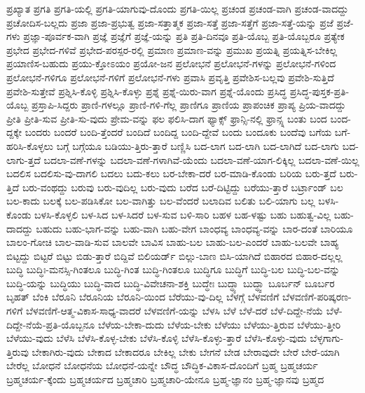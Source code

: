 {ಪ್ರಖ್ಯಾತ
ಪ್ರಗತಿ
ಪ್ರಗತಿ-ಯಲ್ಲಿ
ಪ್ರಗತಿ-ಯಾಗುವು-ದೊಂದು
ಪ್ರಗತಿ-ಯಿಲ್ಲ
ಪ್ರಚಂಡ
ಪ್ರಚಂಡ-ವಾಗಿ
ಪ್ರಚಂಡ-ವಾದದ್ದು
ಪ್ರಚೋದಿಸ-ಬಲ್ಲದು
ಪ್ರಜಾ
ಪ್ರಜಾ-ಪ್ರಭುತ್ವ
ಪ್ರಜಾ-ಸತ್ತಾತ್ಮಕ
ಪ್ರಜಾ-ಸತ್ತೆ
ಪ್ರಜಾ-ಸತ್ತೆಗೆ
ಪ್ರಜಾ-ಸತ್ತೆ-ಯನ್ನು
ಪ್ರಜೆ
ಪ್ರಜೆ-ಗಳು
ಪ್ರಜ್ಞಾ-ಪೂರ್ವಕ-ವಾಗಿ
ಪ್ರಜ್ಞೆ
ಪ್ರಜ್ಞೆಗೆ
ಪ್ರಜ್ಞೆ-ಯನ್ನು
ಪ್ರತಿ
ಪ್ರತಿ-ದಿನವೂ
ಪ್ರತಿ-ಯೊಬ್ಬ
ಪ್ರತಿ-ಯೊಬ್ಬರೂ
ಪ್ರತ್ಯೇಕ
ಪ್ರಭೇದ
ಪ್ರಭೇದ-ಗಳಿವೆ
ಪ್ರಭೇದ-ಪರಸ್ಪರ-ರಲ್ಲಿ
ಪ್ರಮಾಣ
ಪ್ರಮಾಣ-ವನ್ನು
ಪ್ರಮುಖ
ಪ್ರಯತ್ನಿ
ಪ್ರಯತ್ನಿಸ-ಬೇಕಿಲ್ಲ
ಪ್ರಯಾಣಿಸ-ಬಹುದು
ಪ್ರಯು-ಕ್ತೋಽಯಂ
ಪ್ರಯೋ-ಜನ
ಪ್ರಲೋಭನೆ
ಪ್ರಲೋಭನೆ-ಗಳನ್ನು
ಪ್ರಲೋಭನೆ-ಗಳಿಂದ
ಪ್ರಲೋಭನೆ-ಗಳಿಗೂ
ಪ್ರಲೋಭನೆ-ಗಳಿಗೆ
ಪ್ರಲೋಭನೆ-ಗಳು
ಪ್ರವಾಸಿ
ಪ್ರವೃತ್ತಿ
ಪ್ರವೇಶಿಸ-ಬಲ್ಲವು
ಪ್ರವೇಶಿ-ಸುತ್ತಿದೆ
ಪ್ರವೇಶಿ-ಸುತ್ತೇವೆ
ಪ್ರಶ್ನಿಸಿ-ಕೊಳ್ಳಿ
ಪ್ರಶ್ನಿಸಿ-ಕೊಳ್ಳು
ಪ್ರಶ್ನೆ
ಪ್ರಶ್ನೆ-ಯಿರು-ವಾಗ
ಪ್ರಶ್ನೆ-ಯೊಂದು
ಪ್ರಸಿದ್ಧ
ಪ್ರಸಿದ್ಧ-ಪುಸ್ತಕ-ಪ್ರತಿ-ಯೊಬ್ಬ
ಪ್ರಸ್ತಾಪಿ-ಸಿದ್ದರು
ಪ್ರಾಣಿ-ಗಳಲ್ಲೂ
ಪ್ರಾಣಿ-ಗಳಿ-ಗೆಲ್ಲ
ಪ್ರಾಣಿಗೂ
ಪ್ರಾಣಿಯ
ಪ್ರಾಪಂಚಿಕ
ಪ್ರಾಪ್ಯ
ಪ್ರಿಯ-ವಾದದ್ದು
ಪ್ರೀತಿ
ಪ್ರೀತಿ-ಸುವ
ಪ್ರೀತಿ-ಸು-ವುದು
ಪ್ರೇಮ-ವನ್ನು
ಫಲ
ಫಲಿಸಿ-ದಾಗ
ಫ್ಯಾಕ್ಸ್
ಫ್ರಾನ್ಸಿ-ನಲ್ಲಿ
ಫ್ರಾನ್ಸ್ನ
ಬಂತು
ಬಂದ
ಬಂದ-ದ್ದಕ್ಕೇ
ಬಂದರು
ಬಂದರೆ
ಬಂದಿ-ತ್ತೆಂದರೆ
ಬಂದಿದೆ
ಬಂದಿದ್ದ
ಬಂದಿ-ದ್ದೇವೆ
ಬಂದು
ಬಂದೂಕು
ಬಂದೆವು
ಬಗೆಯ
ಬಗೆ-ಹರಿಸಿ-ಕೊಳ್ಳಲು
ಬಗ್ಗೆ
ಬಗ್ಗೆಯೂ
ಬಡಿಯು-ತ್ತಿರು-ತ್ತಾರೆ
ಬಣ್ಣಿಸಿ
ಬದ-ಲಾಗ
ಬದ-ಲಾಗಿ
ಬದ-ಲಾಗಿದೆ
ಬದ-ಲಾಗು
ಬದ-ಲಾಗು-ತ್ತದೆ
ಬದಲಾ-ವಣೆ-ಗಳನ್ನು
ಬದಲಾ-ವಣೆ-ಗಳಾಗಿವೆ-ಯೆಂದು
ಬದಲಾ-ವಣೆ-ಯಾಗ-ಲಿಕ್ಕಿಲ್ಲ
ಬದಲಾ-ವಣೆ-ಯಿಲ್ಲ
ಬದಲಿಸ
ಬದಲಿಸು-ವು-ದಾಗಲಿ
ಬದಲು
ಬದು-ಕಲು
ಬರ-ಬೇಕಾ-ದರೆ
ಬರ-ಮಾಡಿ-ಕೊಂಡು
ಬರಿಯ
ಬರು-ತ್ತದೆ
ಬರು-ತ್ತಿದೆ
ಬರು-ವಂಥದ್ದು
ಬರುವು
ಬರು-ವುದಿಲ್ಲ
ಬರು-ವುದು
ಬರೆದ
ಬರೆ-ದಿಟ್ಟಿದ್ದು
ಬರೆಯು-ತ್ತಾರೆ
ಬರ್ಟ್ರಾಂಡ್
ಬಲ
ಬಲ-ಕಾದು
ಬಲಕ್ಕೆ
ಬಲ-ಪಡಿಸಿಕೋ
ಬಲ-ವಾಗಿತ್ತು
ಬಲ-ವೆಂದರೆ
ಬಲಾದಿವ
ಬಲಿತು
ಬಲಿ-ಯಾಗು
ಬಲ್ಲ
ಬಳಸಿ-ಕೊಂಡು
ಬಳಸಿ-ಕೊಳ್ಳಲಿ
ಬಳ-ಸಿದ
ಬಳ-ಸಿದರೆ
ಬಳ-ಸುವ
ಬಳಿ-ಸಾರಿ
ಬಹಳ
ಬಹ-ಳಷ್ಟು
ಬಹು
ಬಹುತ್ವ-ವಿಲ್ಲ
ಬಹು-ದಾದದ್ದು
ಬಹುದು
ಬಹು-ಭಾಗ-ವನ್ನು
ಬಹು-ವಾಗಿ
ಬಹು-ವೇಗ
ಬಾಂಧವ್ಯ
ಬಾಂಧವ್ಯ-ವನ್ನು
ಬಾರ-ದಂತೆ
ಬಾರಿಯೂ
ಬಾಲಂ-ಗೋಚಿ
ಬಾಲ-ವಾಡಿ-ಸುವ
ಬಾಲವೇ
ಬಾವಿಸ
ಬಾಹು-ಬಲ
ಬಾಹು-ಬಲ-ಎಂದರೆ
ಬಾಹು-ಬಲವೇ
ಬಾಹ್ಯ
ಬಿಟ್ಟದ್ದು
ಬಿಟ್ಟರೆ
ಬಿಟ್ಟು
ಬಿಡು-ತ್ತಾರೆ
ಬಿದ್ದಿವೆ
ಬಿಲಿಯರ್ಡ್
ಬಿಲ್ಲು-ಬಾಣ
ಬಿಸಿ-ಯಾಗಿದೆ
ಬಿಹಾರದ
ಬಿಹಾರ-ದಲ್ಲಲ್ಲ
ಬುದ್ಧಿ
ಬುದ್ಧಿಃ-ಮನಸ್ಸಿ-ಗಿಂತಲೂ
ಬುದ್ಧಿ-ಗಿಂತ
ಬುದ್ಧಿ-ಗಿಂತಲೂ
ಬುದ್ಧಿಗೂ
ಬುದ್ಧಿಗೆ
ಬುದ್ಧಿ-ಬಲ
ಬುದ್ಧಿ-ಬಲ-ವನ್ನು
ಬುದ್ಧಿ-ಯನ್ನು
ಬುದ್ಧಿಯು
ಬುದ್ಧಿ-ವಾದ
ಬುದ್ಧಿ-ವಿವೇಚನಾ-ಶಕ್ತಿ
ಬುದ್ಧೇಃ
ಬುದ್ಧ್ಯಾ
ಬುದ್ಧ್ವಾ
ಬೂರ್ಬನ್
ಬೂರ್ಬರ
ಬೃಹತ್
ಬೆಂಕಿ
ಬೆರೂನಿ
ಬೆರೂನಿಯ
ಬೆರೂನಿ-ಯಿಂದ
ಬೆರೆಯು-ವು-ದಿಲ್ಲ
ಬೆಳಗ್ಗೆ
ಬೆಳವಣಿಗೆ
ಬೆಳವಣಿಗೆ-ಪರಿಷ್ಕರಣ-ಗಳಿಗೆ
ಬೆಳವಣಿಗೆ-ಆತ್ಮ-ವಿಕಾಸ-ಸಾಧ್ಯ-ವಾದರೆ
ಬೆಳವಣಿಗೆ-ಯನ್ನು
ಬೆಳಸಿ
ಬೆಳೆ
ಬೆಳೆ-ದರೆ
ಬೆಳೆ-ದಿದ್ದೇ-ನೆಯೆ
ಬೆಳೆ-ದಿದ್ದೇ-ನೆಯೆ-ಪ್ರತಿ-ಯೊಬ್ಬನೂ
ಬೆಳೆಯ-ಬೇಕಾ-ದುದು
ಬೆಳೆಯ-ಬೇಕು
ಬೆಳೆಯು
ಬೆಳೆಯು-ತ್ತಿರುವ
ಬೆಳೆಯು-ತ್ತೀರಿ
ಬೆಳೆಯು-ವುದು
ಬೆಳೆಸಿ
ಬೆಳೆಸಿ-ಕೊಳ್ಳ-ಬೇಕು
ಬೆಳೆಸಿ-ಕೊಳ್ಳಿ
ಬೆಳೆಸಿ-ಕೊಳ್ಳು-ತ್ತಾರೆ
ಬೆಳೆಸಿ-ಕೊಳ್ಳು-ವುದು
ಬೆಳ್ಳಗಾಗು-ತ್ತಿರುವು
ಬೇಕಾಗಿರು-ವುದು
ಬೇಕಾದ
ಬೇಕಾದರೂ
ಬೇಕಿಲ್ಲ
ಬೇಕು
ಬೇಗನೆ
ಬೇಡ
ಬೇರಾವುದೇ
ಬೇರೆ
ಬೇರೆ-ಯಾಗಿ
ಬೇರೆಲ್ಲ
ಬೋಧನೆ
ಬೋಧನೆಯ
ಬೋಧನೆ-ಯನ್ನೇ
ಬೌದ್ಧ
ಬೌದ್ಧಿಕ-ವಿಕಾಸ-ದೊಂದಿಗೆ
ಬ್ರಹ್ಮ
ಬ್ರಹ್ಮಚರ್ಯ
ಬ್ರಹ್ಮಚರ್ಯ-ಕ್ಕೆಂದು
ಬ್ರಹ್ಮಚರ್ಯದ
ಬ್ರಹ್ಮಚಾರಿ
ಬ್ರಹ್ಮಚಾರಿ-ಯೇನೂ
ಬ್ರಹ್ಮ-ಜ್ಞಾನಂ
ಬ್ರಹ್ಮ-ಜ್ಞಾನವು
ಬ್ರಹ್ಮದ
}
